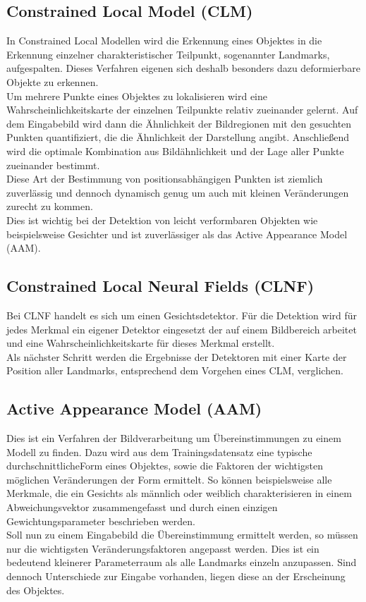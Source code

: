 \subsection{Constrained Local Model (CLM)}
In Constrained Local Modellen wird die Erkennung eines Objektes in die Erkennung einzelner charakteristischer Teilpunkt, sogenannter Landmarks, aufgespalten. Dieses Verfahren eigenen sich deshalb besonders dazu deformierbare Objekte zu erkennen.\\
Um mehrere Punkte eines Objektes zu lokalisieren wird eine Wahrscheinlichkeitskarte der einzelnen Teilpunkte relativ zueinander gelernt. Auf dem Eingabebild wird dann die Ähnlichkeit der Bildregionen mit den gesuchten Punkten quantifiziert, die die Ähnlichkeit der Darstellung angibt. Anschließend wird die optimale Kombination aus Bildähnlichkeit und der Lage aller Punkte zueinander bestimmt.\\
Diese Art der Bestimmung von positionsabhängigen Punkten ist ziemlich zuverlässig und dennoch dynamisch genug um auch mit kleinen Veränderungen zurecht zu kommen.\\
Dies ist wichtig bei der Detektion von leicht verformbaren Objekten wie beispielsweise Gesichter und ist zuverlässiger als das Active Appearance Model (AAM).
\cite{pdf_CLM}
\subsection{Constrained Local Neural Fields (CLNF)}
Bei CLNF handelt es sich um einen Gesichtsdetektor. Für die Detektion wird für jedes Merkmal ein eigener Detektor eingesetzt der auf einem Bildbereich arbeitet und eine Wahrscheinlichkeitskarte für dieses Merkmal erstellt.\\
Als nächster Schritt werden die Ergebnisse der Detektoren mit einer Karte der Position aller Landmarks, entsprechend dem Vorgehen eines CLM, verglichen.
\cite{CLNF}
\subsection{Active Appearance Model (AAM)}
Dies ist ein Verfahren der Bildverarbeitung um Übereinstimmungen zu einem Modell zu finden. Dazu wird aus dem Trainingsdatensatz eine typische \glqq durchschnittliche\grqq Form eines Objektes, sowie die Faktoren der wichtigsten möglichen Veränderungen der Form ermittelt. So können beispielsweise alle Merkmale, die ein Gesichts als männlich oder weiblich charakterisieren in einem Abweichungsvektor zusammengefasst und durch einen einzigen Gewichtungsparameter beschrieben werden.\\
Soll nun zu einem Eingabebild die Übereinstimmung ermittelt werden, so müssen nur die wichtigsten Veränderungsfaktoren angepasst werden. Dies ist ein bedeutend kleinerer Parameterraum als alle Landmarks einzeln anzupassen. Sind dennoch Unterschiede zur Eingabe vorhanden, liegen diese an der Erscheinung des Objektes.
\cite{wiki_AAM}

